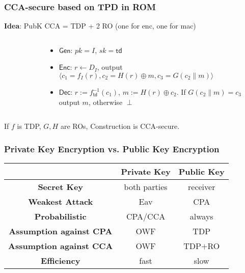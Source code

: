 \begin{frame}\frametitle{CCA-secure based on TPD in ROM}
\textbf{Idea}: PubK CCA = TDP + 2 RO (one for enc, one for mac)
\begin{columns}[t]
\begin{column}{5cm}
\begin{figure}[t]
\begin{center}

\end{center}
\end{figure}\end{column}
\begin{column}{5cm}
\begin{construction}
\begin{itemize}
\item $\mathsf{Gen}$: $pk = I$, $sk = \mathsf{td}$
\item $\mathsf{Enc}$: $r \gets D_I$, output $\langle c_1=f_I(r), c_2 = H(r)\oplus m, c_3=G(c_2\|m)\rangle$
\item $\mathsf{Dec}$: $r := f^{-1}_{\mathsf{td}}(c_1)$, $m := H(r)\oplus c_2$. If $G(c_2\|m) = c_3$ output $m$, otherwise $\perp$
\end{itemize}
\end{construction}
\end{column}
\end{columns}
\begin{theorem}
If $f$ is TDP, $G,H$ are ROs, Construction is CCA-secure.
\end{theorem}
\end{frame}

\begin{frame}\frametitle{Private Key Encryption vs. Public Key Encryption}
\begin{center}
\begin{tabular}{|c|c|c|} \hline
   & \textbf{Private Key} & \textbf{Public Key}             \\ \hline
\textbf{Secret Key}               & both parties & receiver \\ \hline
\textbf{Weakest Attack}           & Eav          & CPA      \\ \hline
\textbf{Probabilistic}            & CPA/CCA      & always   \\ \hline
\textbf{Assumption against CPA}   & OWF          & TDP      \\ \hline
\textbf{Assumption against CCA}   & OWF          & TDP$+$RO   \\ \hline
\textbf{Efficiency}               & fast         & slow     \\ \hline
\end{tabular}	
\end{center}
\end{frame}

